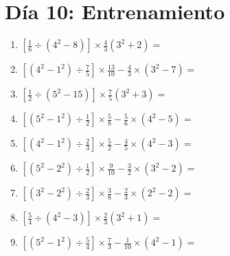\documentclass[12pt]{article}
\begin{document}
\section*{Día 10: Entrenamiento}
\begin{enumerate}[ itemsep=1.5cm]
	\item $\displaystyle \left[ \frac{1}{6} \div \left( 4^2 - 8 \right) \right] \times \frac{4}{3} \left( 3^2 + 2 \right) =$
	\item $\displaystyle \left[ \left( 4^2 - 1^2 \right) \div \frac{7}{5} \right] \times \frac{13}{10} - \frac{4}{3} \times \left( 3^2 - 7 \right) =$
	\item $\displaystyle \left[ \frac{1}{2} \div \left( 5^2 - 15 \right) \right] \times \frac{7}{5} \left( 3^2 + 3 \right) =$
	\item $\displaystyle \left[ \left( 5^2 - 1^2 \right) \div \frac{1}{2} \right] \times \frac{5}{8} - \frac{5}{6} \times \left( 4^2 - 5 \right) =$
	\item $\displaystyle \left[ \left( 4^2 - 1^2 \right) \div \frac{2}{3} \right] \times \frac{5}{2} - \frac{4}{5} \times \left( 4^2 - 3 \right) =$
	\item $\displaystyle \left[ \left( 5^2 - 2^2 \right) \div \frac{1}{2} \right] \times \frac{9}{10} - \frac{3}{2} \times \left( 3^2 - 2 \right) =$
	\item $\displaystyle \left[ \left( 3^2 - 2^2 \right) \div \frac{2}{3} \right] \times \frac{3}{8} - \frac{2}{3} \times \left( 2^2 - 2 \right) =$
	\item $\displaystyle \left[ \frac{5}{4} \div \left( 4^2 - 3 \right) \right] \times \frac{2}{3} \left( 3^2 + 1 \right) =$
	\item $\displaystyle \left[ \left( 5^2 - 1^2 \right) \div \frac{5}{4} \right] \times \frac{7}{3} - \frac{1}{10} \times \left( 4^2 - 1 \right) =$


\end{enumerate}
\end{document}
